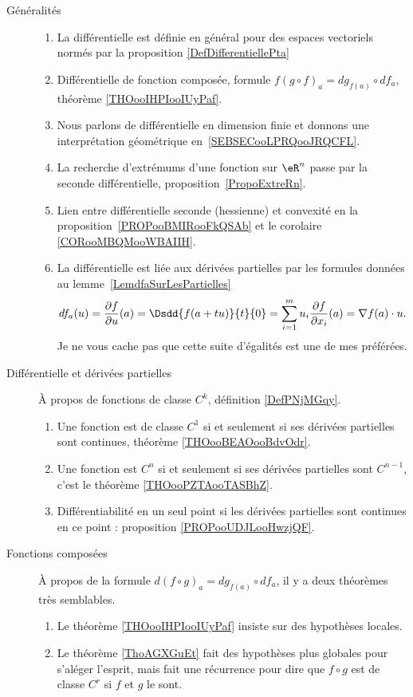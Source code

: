 \begin{description}
    \item[Généralités] 
\begin{enumerate}
    \item
        La différentielle est définie en général pour des espaces vectoriels normés par la proposition \ref{DefDifferentiellePta}
    \item
        Différentielle de fonction composée, formule \( f(g\circ f)_a=dg_{f(a)}\circ df_a\), théorème \ref{THOooIHPIooIUyPaf}.
    \item
        Nous parlons de différentielle en dimension finie et donnons une interprétation géométrique en~\ref{SEBSECooLPRQooJRQCFL}.
    \item
        La recherche d'extrémums d'une fonction sur \( \eR^n\) passe par la seconde différentielle, proposition~\ref{PropoExtreRn}.
    \item
        Lien entre différentielle seconde (hessienne) et convexité en la proposition~\ref{PROPooBMIRooFkQSAb} et le corolaire \ref{CORooMBQMooWBAIIH}.
    \item
        La différentielle est liée aux dérivées partielles par les formules données au lemme~\ref{LemdfaSurLesPartielles}
	\begin{equation}
        df_a(u)=\frac{ \partial f }{ \partial u }(a)=\Dsdd{ f(a+tu) }{t}{0}=\sum_{i=1}^mu_i\frac{ \partial f }{ \partial x_i }(a)=\nabla f(a)\cdot u.
	\end{equation}
    Je ne vous cache pas que cette suite d'égalités est une de mes préférées.
\end{enumerate}
\item[Différentielle et dérivées partielles]
    À propos de fonctions de classe \( C^k\), définition \ref{DefPNjMGqy}.
    \begin{enumerate}
    \item
        Une fonction est de classe \( C^1\) si et seulement si ses dérivées partielles sont continues, théorème \ref{THOooBEAOooBdvOdr}.
    \item
        Une fonction est \( C^n\) si et seulement si ses dérivées partielles sont \( C^{n-1}\), c'est le théorème \ref{THOooPZTAooTASBhZ}.
    \item
        Différentiabilité en un seul point si les dérivées partielles sont continues en ce point : proposition \ref{PROPooUDJLooHwzjQF}.
    \end{enumerate}
\item[Fonctions composées]
    À propos de la formule \( d(f\circ g)_a=dg_{f(a)}\circ df_a\), il y a deux théorèmes très semblables.
    \begin{enumerate}
        \item
            Le théorème \ref{THOooIHPIooIUyPaf} insiste sur des hypothèses locales.
        \item
            Le théorème \ref{ThoAGXGuEt} fait des hypothèses plus globales pour s'aléger l'esprit, mais fait une récurrence pour dire que \( f\circ g\) est de classe \( C^r\) si \( f\) et \( g\) le sont.
    \end{enumerate}
\end{description}

